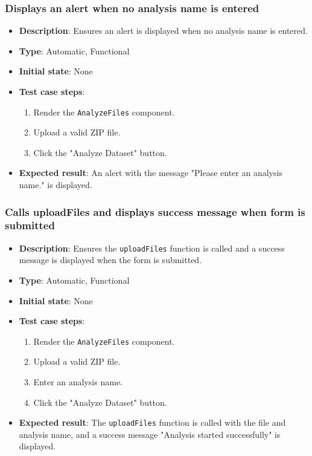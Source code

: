 \documentclass[12pt, titlepage]{article}
\begin{document}
\subsubsection{Displays an alert when no analysis name is entered}
\begin{itemize}
    \item \textbf{Description}: Ensures an alert is displayed when no analysis name is entered.
    \item \textbf{Type}: Automatic, Functional
    \item \textbf{Initial state}: None
    \item \textbf{Test case steps}:
    \begin{enumerate}
        \item Render the \texttt{AnalyzeFiles} component.
        \item Upload a valid ZIP file.
        \item Click the "Analyze Dataset" button.
    \end{enumerate}
    \item \textbf{Expected result}: An alert with the message "Please enter an analysis name." is displayed.
    
\end{itemize}

\subsubsection{Calls uploadFiles and displays success message when form is submitted}
\begin{itemize}
    \item \textbf{Description}: Ensures the \texttt{uploadFiles} function is called and a success message is displayed when the form is submitted.
    \item \textbf{Type}: Automatic, Functional
    \item \textbf{Initial state}: None
    \item \textbf{Test case steps}:
    \begin{enumerate}
        \item Render the \texttt{AnalyzeFiles} component.
        \item Upload a valid ZIP file.
        \item Enter an analysis name.
        \item Click the "Analyze Dataset" button.
    \end{enumerate}
    \item \textbf{Expected result}: The \texttt{uploadFiles} function is called with the file and analysis name, and a success message "Analysis started successfully" is displayed.
\end{itemize}
\end{document}
